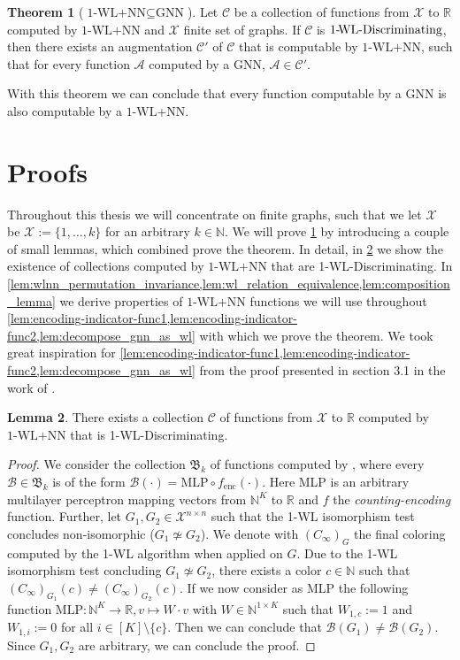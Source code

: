 \documentclass[11pt, dvipsnames, DIV=12]{scrreprt}
\theoremstyle{definition}
\newtheorem{theorem}{Theorem}
\newtheorem{lemma}[theorem]{Lemma}
\newcommand{\cA}{\mathcal{A}}
\newcommand{\cC}{\mathcal{C}}
\newcommand{\cX}{\mathcal{X}}
\newcommand{\Nb}{\mathbb{N}}
\newcommand{\Rb}{\mathbb{R}}
\newcommand{\wlnn}{\text{1-WL+NN}}
\newcommand{\wldisc}{\text{1-\!WL-Discriminating}}
\begin{document}
\begin{theorem}[$\wlnn \subseteq \text{GNN}$]\label{theorem:1wl_in_gnn}
    Let $\cC$ be a collection of functions from $\cX$ to $\Rb$ computed by $\wlnn$ and $\cX$ finite set of graphs. If $\cC$ is $\wldisc$, then there exists an augmentation $\cC'$ of $\cC$ that is computable by $\wlnn$, such that for every function $\cA$ computed by a GNN, $\cA \in \cC'$.
\end{theorem}
\noindent With this theorem we can conclude that every function computable by a GNN is also computable by a $\wlnn$.


\section{Proofs}
Throughout this thesis we will concentrate on finite graphs, such that we let $\mathcal{X}$ be $\mathcal{X} := \{1, \dots, k\}$ for an arbitrary $k \in \Nb$. We will prove \cref{theorem:1wl_in_gnn} by introducing a couple of small lemmas, which combined prove the theorem. In detail, in \cref{lem:wl_disc_exists} we show the existence of collections computed by $\wlnn$ that are 1-\!WL-Discriminating. In \cref{lem:wlnn_permutation_invariance,lem:wl_relation_equivalence,lem:composition_lemma} we derive properties of $\wlnn$ functions we will use throughout \cref{lem:encoding-indicator-func1,lem:encoding-indicator-func2,lem:decompose_gnn_as_wl} with which we prove the theorem.
We took great inspiration for \cref{lem:encoding-indicator-func1,lem:encoding-indicator-func2,lem:decompose_gnn_as_wl} from the proof presented in section 3.1 in the work of \cite{Chen2019}.

\begin{lemma}\label{lem:wl_disc_exists}
    There exists a collection $\cC$ of functions from $\cX$ to $\Rb$ computed by $\wlnn$ that is 1-\!WL-Discriminating.
\end{lemma}
\begin{proof}
We consider the collection $\mathfrak{B}_k$ of functions computed by \wlnn, where every $\mathcal{B} \in \mathfrak{B}_k$ is of the form $\mathcal{B}(\cdot) = \text{MLP} \circ f_{\text{enc}}(\cdot)$. Here MLP is an arbitrary multilayer perceptron mapping vectors from $\Nb^K$ to $\Rb$ and $f$ the \textit{counting-encoding} function. Further, let $G_1, G_2 \in \mathcal{X}^{n\times n}$ such that the 1-WL isomorphism test concludes non-isomorphic ($G_1 \not\simeq G_2$). We denote with $(C_{\infty})_G$ the final coloring computed by the 1-WL algorithm when applied on $G$.
Due to the 1-WL isomorphism test concluding $G_1 \not\simeq G_2$, there exists a color $c \in \Nb$ such that $(C_{\infty})_{G_1}(c) \neq (C_{\infty})_{G_2}(c)$. If we now consider as MLP the following function $\text{MLP}: \Nb^K \rightarrow \Rb, v \mapsto W \cdot v$ with $W \in \Nb^{1 \times K}$ such that $W_{1,c} := 1$ and $W_{1,i} := 0$ for all $i \in [K] \setminus \{c\}$. Then we can conclude that $\mathcal{B}(G_1) \neq \mathcal{B}(G_2)$. Since $G_1,G_2$ are arbitrary, we can conclude the proof.
\end{proof}
\end{document}
